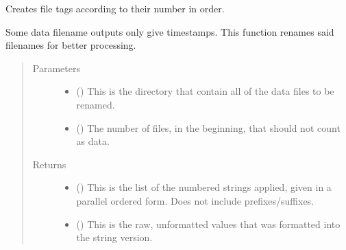 \documentclass[letterpaper,10pt,english]{sphinxmanual}
\begin{document}
\begin{fulllineitems}
\label{\detokenize{docstrings/ifa_smeargle.reformat.renaming:ifa_smeargle.reformat.renaming.rename_number}}
Creates file tags according to their number in order.

Some data filename outputs only give timestamps. This function
renames said filenames for better processing.
\begin{quote}\begin{description}
\item[{Parameters}] \leavevmode\begin{itemize}
\item {} 
 () \textendash{} This is the directory that contain all of the data files to
be renamed.

\item {} 
 (\sphinxstyleliteralemphasis{\sphinxupquote{ (}}\sphinxstyleliteralemphasis{\sphinxupquote{)}}) \textendash{} The number of files, in the beginning, that should not count
as data.

\end{itemize}

\item[{Returns}] \leavevmode
\begin{itemize}
\item {} 
 () \textendash{} This is the list of the numbered strings applied, given in
a parallel ordered form. Does not include prefixes/suffixes.

\item {} 
 () \textendash{} This is the raw, unformatted values that was formatted
into the string version.

\end{itemize}


\end{description}\end{quote}

\end{fulllineitems}
\end{document}
